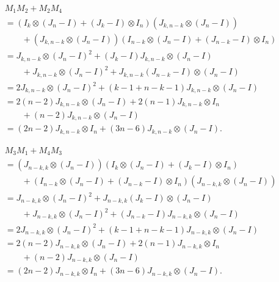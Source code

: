 \begin{align*}
    &M_1M_2 + M_2M_4 \\
    &= (I_k \otimes (J_n-I) + (J_k-I) \otimes I_n)(J_{k,n-k}\otimes (J_n-I))\\
    &\quad\quad + (J_{k,n-k}\otimes (J_n-I))(I_{n-k} \otimes (J_n-I) + (J_{n-k}-I)\otimes I_n)\\
    &= J_{k,n-k}\otimes (J_n-I)^2 + (J_k-I)J_{k,n-k}\otimes (J_n-I)\\
    &\quad\quad + J_{k,n-k}\otimes (J_n-I)^2 + J_{k,n-k}(J_{n-k}-I)\otimes (J_n-I)\\
    &= 2J_{k,n-k}\otimes (J_n-I)^2 + (k-1 +n-k-1)J_{k,n-k}\otimes (J_n-I)\\
    &= 2(n-2)J_{k,n-k}\otimes (J_n-I) + 2(n-1)J_{k,n-k}\otimes I_n\\
    &\quad\quad + (n-2)J_{k,n-k}\otimes (J_n-I)\\
    &= (2n-2)J_{k,n-k}\otimes I_n + (3n-6)J_{k,n-k}\otimes (J_n-I).
\end{align*}

\begin{align*}
    &M_3M_1 + M_4M_3 \\
    &= (J_{n-k,k}\otimes (J_n-I))(I_k \otimes (J_n-I) + (J_k-I) \otimes I_n)\\
    &\quad\quad + (I_{n-k} \otimes (J_n-I) + (J_{n-k}-I)\otimes I_n)(J_{n-k,k}\otimes (J_n-I))\\
    &= J_{n-k,k}\otimes (J_n-I)^2 + J_{n-k,k}(J_k-I)\otimes (J_n-I) \\
    &\quad\quad + J_{n-k,k}\otimes (J_n-I)^2 + (J_{n-k}-I)J_{n-k,k}\otimes (J_n-I)\\
    &= 2J_{n-k,k}\otimes (J_n-I)^2 + (k-1 +n-k-1)J_{n-k,k}\otimes (J_n-I)\\
    &= 2(n-2)J_{n-k,k}\otimes (J_n-I) + 2(n-1)J_{n-k,k}\otimes I_n\\
    &\quad\quad + (n-2)J_{n-k,k}\otimes (J_n-I)\\
    &= (2n-2)J_{n-k,k}\otimes I_n + (3n-6)J_{n-k,k}\otimes (J_n-I).
\end{align*}

